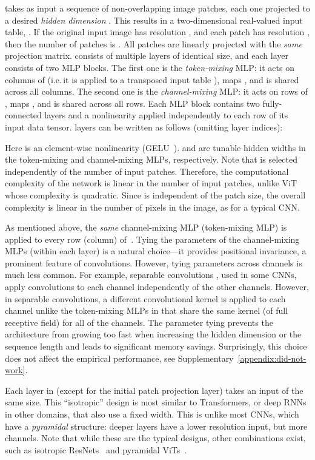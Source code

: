 \name{} takes as input a sequence of  non-overlapping image patches, each one projected to a desired \emph{hidden dimension} .
This results in a two-dimensional real-valued input table, .
If the original input image has resolution ,
and each patch has resolution ,
then the number of patches is .
All patches are linearly projected with the \emph{same} projection matrix.
\name{} consists of multiple layers of identical size, and each layer consists of two MLP blocks.
The first one is the \emph{token-mixing} MLP: it acts on columns of  (i.e.\,it is applied to a transposed input table ), maps , and is shared across all columns.
The second one is the \emph{channel-mixing} MLP: it acts on rows of , maps , and is shared across all rows.
Each MLP block contains two fully-connected layers and a nonlinearity applied independently to each row of its input data tensor. 
\name{} layers can be written as follows (omitting layer indices):

Here  is an element-wise nonlinearity (GELU~\cite{hendrycks2016gelu}).
 and  are tunable hidden widths in the token-mixing and channel-mixing MLPs, respectively.
Note that  is selected independently of the number of input patches.
Therefore, the computational complexity of the network is linear in the number of input patches, unlike ViT whose complexity is quadratic.
Since  is independent of the patch size, the overall complexity is linear in the number of pixels in the image, as for a typical CNN.

As mentioned above, the \emph{same} channel-mixing MLP (token-mixing MLP) is applied to every row (column) of~.
Tying the parameters of the channel-mixing MLPs (within each layer) is a natural choice---it provides positional invariance, a prominent feature of convolutions.
However, tying  parameters across channels is much less common.
For example, separable convolutions \cite{chollet2017xception,Sifre2014phd}, used in some CNNs, apply convolutions to each channel independently of the other channels.
However, in separable convolutions, a different convolutional
kernel is applied to each channel unlike the token-mixing MLPs in \name{} that share the same kernel (of full receptive field) for all of the channels.
The parameter tying prevents the architecture from growing too fast when increasing the hidden dimension  or the sequence length  and leads to significant memory savings.
Surprisingly, this choice does not affect the empirical performance, see Supplementary~\ref{appendix:did-not-work}.

Each layer in \name{} (except for the initial patch projection layer) takes an input of the same size.
This ``isotropic'' design is most similar to Transformers, or deep RNNs in other domains, that also use a fixed width.
This is unlike most CNNs, which have a \emph{pyramidal} structure: deeper layers have a lower resolution input, but more channels.
Note that while these are the typical designs, other combinations exist, such as isotropic ResNets~\citep{Sandler2019} and pyramidal ViTs~\citep{wang2021pyramid}.

